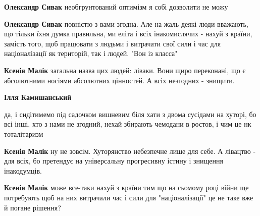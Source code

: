 \begin{itemize}
\begin{itemize}
\textbf{Олександр Сивак} необгрунтований оптимізм я собі дозволити не можу

\textbf{Олександр Сивак} повністю з вами згодна. Але на жаль деякі люди вважають, що тільки їхня думка правильна, ми еліта і всіх інакомислячих - нахуй з країни, замість того, щоб працювати з людьми і витрачати свої сили і час для націоналізації як територій, так і людей. "Вон із класса"

\textbf{Ксенія Малік} загальна назва цих людей: ліваки.
Вони щиро переконані, що є абсолютними носіями абсолютних цінностей. А всіх незгодних - знищити.

\textbf{Ілля Камишанський} 

да, і сидітимемо під садочком вишневим біля хати з двома сусідами на хуторі, бо
всі інші, хто з нами не згодний, нехай збирають чемодани в ростов, і чим це нк
тоталітаризм


\textbf{Ксенія Малік} ну не зовсім. Хуторянство небезпечне лише для себе.
А лівацтво - для всіх, бо претендує на універсальну прогресивну істину і знищення інакодумців.

\textbf{Ксенія Малік} може все-таки нахуй з країни тим що на сьомому році війни ще потребують щоб на них витрачали час і сили для "націоналізації" це не таке вже й погане рішення?
\end{itemize} %


\end{itemize} %
